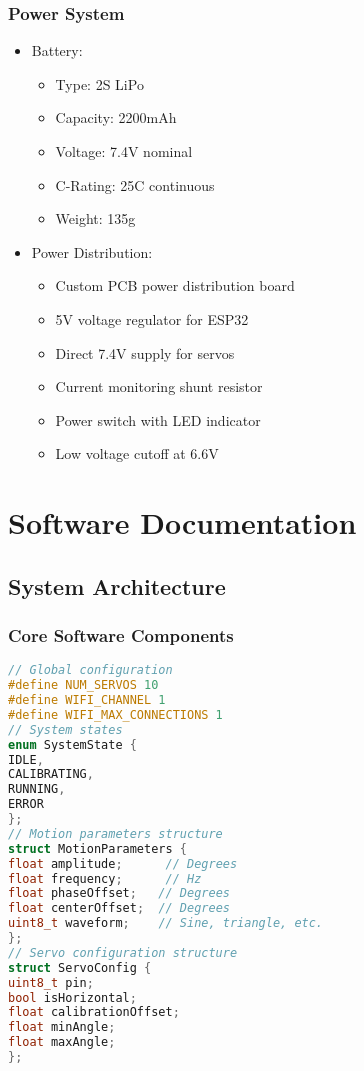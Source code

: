 \documentclass[12pt,a4paper]{report}
\begin{document}
\subsection{Power System}
\begin{itemize}
\item Battery:
\begin{itemize}
\item Type: 2S LiPo
\item Capacity: 2200mAh
\item Voltage: 7.4V nominal
\item C-Rating: 25C continuous
\item Weight: 135g
\end{itemize}
\item Power Distribution:
\begin{itemize}
    \item Custom PCB power distribution board
    \item 5V voltage regulator for ESP32
    \item Direct 7.4V supply for servos
    \item Current monitoring shunt resistor
    \item Power switch with LED indicator
    \item Low voltage cutoff at 6.6V
\end{itemize}
\end{itemize}   
\chapter{Software Documentation}
\section{System Architecture}
\subsection{Core Software Components}
\begin{lstlisting}[language=C++]
// Global configuration
#define NUM_SERVOS 10
#define WIFI_CHANNEL 1
#define WIFI_MAX_CONNECTIONS 1
// System states
enum SystemState {
IDLE,
CALIBRATING,
RUNNING,
ERROR
};
// Motion parameters structure
struct MotionParameters {
float amplitude;      // Degrees
float frequency;      // Hz
float phaseOffset;   // Degrees
float centerOffset;  // Degrees
uint8_t waveform;    // Sine, triangle, etc.
};
// Servo configuration structure
struct ServoConfig {
uint8_t pin;
bool isHorizontal;
float calibrationOffset;
float minAngle;
float maxAngle;
};
\end{lstlisting}
\end{document}
